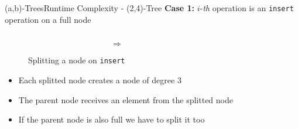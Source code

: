 


\begin{frame}{(a,b)-Trees}{Runtime Complexity - (2,4)-Tree}
  \textbf{Case 1:}
  {\color{Mittel-Blau}$i$}-\textit{th} operation is an
  \texttt{\color{Mittel-Blau}insert} operation on a full node
  \begin{figure}
    \begin{columns}
      \begin{column}{0.35\linewidth}
        \begin{adjustbox}{width=\linewidth}
          
        \end{adjustbox}
      \end{column}
      \begin{column}{0.1\linewidth}
        \begin{center}
          $\Rightarrow$
        \end{center}
      \end{column}
      \begin{column}{0.35\linewidth}
        \begin{adjustbox}{width=\linewidth}
          
        \end{adjustbox}
      \end{column}
    \end{columns}
    \caption{Splitting a node on \texttt{\color{Mittel-Blau}insert}}
    \label{fig:a_b_tree:node_split_potential}
  \end{figure}
  \begin{itemize}
    \item<3->
      Each splitted node creates a node of {\color{Mittel-Blau}degree 3}
    \item<4->
      The parent node receives an element from the splitted node
    \item<5->
      If the parent node is also full we have to split it too
  \end{itemize}
\end{frame}

